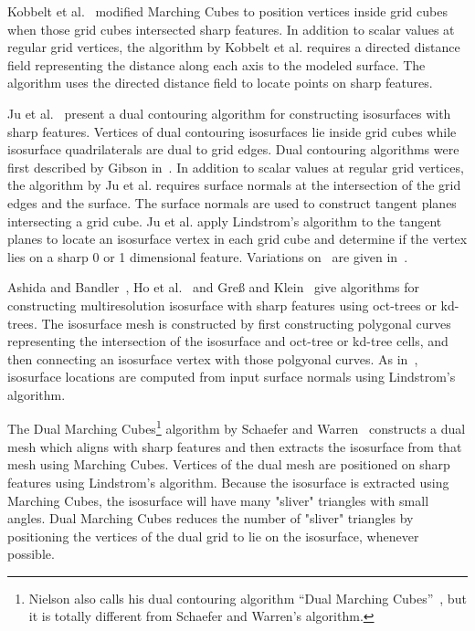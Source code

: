 Kobbelt et al.~\cite{kbsh-fssev-01} modified Marching Cubes 
to position vertices inside grid cubes when those grid cubes
intersected sharp features.
In addition to scalar values at regular grid vertices,
the algorithm by Kobbelt et al. requires a directed distance field
representing the distance along each axis to the modeled surface.
The algorithm uses the directed distance field
to locate points on sharp features.

Ju et al.~\cite{jlsw-dchd-02,sw-dcss-02} present a dual contouring algorithm
for constructing isosurfaces with sharp features.
Vertices of dual contouring isosurfaces lie inside grid cubes
while isosurface quadrilaterals are dual to grid edges.
Dual contouring algorithms were first described
by Gibson in~\cite{gh-ssqem-97,g-cesng-98}.
In addition to scalar values at regular grid vertices,
the algorithm by Ju et al. requires surface normals
at the intersection of the grid edges and the surface.
The surface normals are used to construct tangent planes
intersecting a grid cube.
Ju et al. apply Lindstrom's algorithm to the tangent planes
to locate an isosurface vertex in each grid cube
and determine if the vertex lies on a sharp 0 or 1 dimensional feature.
Variations on~\cite{jlsw-dchd-02} are given 
in~\cite{zhk-dctps-04,Varadhan:2003:fss}.

Ashida and Bandler~\cite{ab-fpmmo-03}, Ho et al.~\cite{hwco-cmsaf-05}
and Gre{\ss} and Klein~\cite{gk-eretm-04} give algorithms
for constructing multiresolution isosurface with sharp features
using oct-trees or kd-trees.
The isosurface mesh is constructed
by first constructing polygonal curves representing the intersection
of the isosurface and oct-tree or kd-tree cells,
and then connecting an isosurface vertex with those polgyonal curves.
As in~\cite{jlsw-dchd-02},
isosurface locations are computed from input surface normals
using Lindstrom's algorithm.

The Dual Marching Cubes\footnote{Nielson also calls his
dual contouring algorithm ``Dual Marching Cubes''~\cite{n-dmc-04},
but it is totally different from Schaefer and Warren's algorithm.}
algorithm by Schaefer and Warren~\cite{sw-dmcpc-04}
constructs a dual mesh which aligns with sharp features
and then extracts the isosurface from that mesh 
using Marching Cubes.
Vertices of the dual mesh are positioned on sharp features
using Lindstrom's algorithm.
Because the isosurface is extracted using Marching Cubes,
the isosurface will have many "sliver" triangles with small angles.
Dual Marching Cubes reduces the number of "sliver" triangles
by positioning the vertices of the dual grid to lie on the isosurface,
whenever possible.

